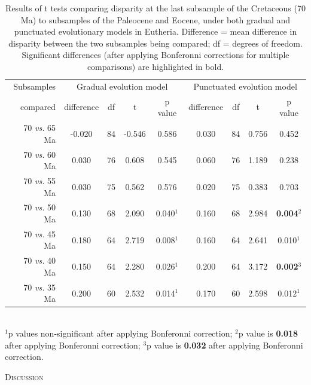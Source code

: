 \documentclass[12pt,letterpaper]{article}
\renewcommand{\section}[1]{%
\bigskip
\begin{center}
\begin{Large}
\normalfont\scshape #1
\medskip
\end{Large}
\end{center}}
\begin{document}
\begin{table}[ht]
\caption{Results of t tests comparing disparity at the last subsample of the Cretaceous (70 Ma) to subsamples of the Paleocene and Eocene, under both gradual and punctuated evolutionary models in Eutheria. Difference = mean difference in disparity between the two subsamples being compared; df = degrees of freedom. Significant differences (after applying Bonferonni corrections for multiple comparisons) are highlighted in bold.}
\label{tab:Tab_beck}
\centering
\begin{tabular}{r|cccc|cccc}
  \hline
  Subsamples & \multicolumn{4}{c|}{Gradual evolution model} & \multicolumn{4}{c}{Punctuated evolution model} \\
  compared & difference & df & t & p value & difference & df & t & p value \\ 
  \hline
  70 \textit{vs.} 65 Ma & -0.020 & 84 & -0.546 & 0.586 & 0.030 & 84 & 0.756 & 0.452 \\ 
  70 \textit{vs.} 60 Ma &  0.030 & 76 & 0.608 & 0.545 & 0.060 & 76 & 1.189 & 0.238 \\ 
  70 \textit{vs.} 55 Ma &  0.030 & 75 & 0.562 & 0.576 & 0.020 & 75 & 0.383 & 0.703 \\ 
  70 \textit{vs.} 50 Ma &  0.130 & 68 & 2.090 & 0.040$^1$ & 0.160 & 68 & 2.984 & \textbf{0.004}$^2$ \\ 
  70 \textit{vs.} 45 Ma &  0.180 & 64 & 2.719 & 0.008$^1$ & 0.160 & 64 & 2.641 & 0.010$^1$ \\ 
  70 \textit{vs.} 40 Ma &  0.150 & 64 & 2.280 & 0.026$^1$ & 0.200 & 64 & 3.172 & \textbf{0.002}$^3$ \\ 
  70 \textit{vs.} 35 Ma &  0.200 & 60 & 2.532 & 0.014$^1$ & 0.170 & 60 & 2.598 & 0.012$^1$ \\ 
   \hline
\end{tabular} \\
   $^1$p values non-significant after applying Bonferonni correction;
   $^2$p value is \textbf{0.018} after applying Bonferonni correction;
   $^3$p value is \textbf{0.032} after applying Bonferonni correction.
\end{table}


%
%

\section{Discussion}
\end{document}
